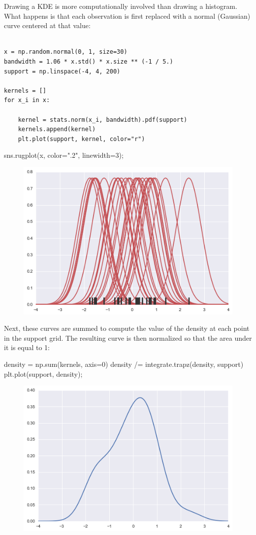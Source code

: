 \begin{frame}[fragile]
Drawing a KDE is more computationally involved than drawing a histogram. What happens is that each observation is first replaced with a normal (Gaussian) curve centered at that value:

\begin{frame}[fragile]
\begin{framed}
\begin{verbatim}

x = np.random.normal(0, 1, size=30)
bandwidth = 1.06 * x.std() * x.size ** (-1 / 5.)
support = np.linspace(-4, 4, 200)

kernels = []
for x_i in x:

    kernel = stats.norm(x_i, bandwidth).pdf(support)
    kernels.append(kernel)
    plt.plot(support, kernel, color="r")

\end{verbatim}
\end{framed}
\end{frame}
sns.rugplot(x, color=".2", linewidth=3);
\begin{figure}
	\centering
	\includegraphics[width=0.7\linewidth]{images/distributions_16_0}
\end{figure}
Next, these curves are summed to compute the value of the density at each point in the support grid. The resulting curve is then normalized so that the area under it is equal to 1:

density = np.sum(kernels, axis=0)
density /= integrate.trapz(density, support)
plt.plot(support, density);
\begin{figure}
	\centering
	\includegraphics[width=0.7\linewidth]{images/distributions_18_0}
\end{figure}
\end{frame}
